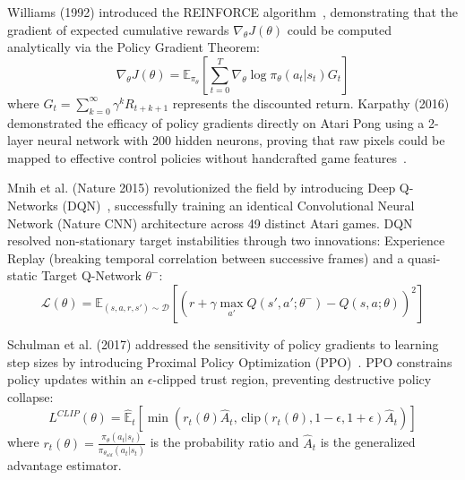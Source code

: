 \documentclass[12pt,a4paper]{report}
\begin{document}
Williams (1992) introduced the REINFORCE algorithm~\cite{williams1992simple}, demonstrating that the gradient of expected cumulative rewards $\nabla_\theta J(\theta)$ could be computed analytically via the Policy Gradient Theorem:
\begin{equation}
    \nabla_\theta J(\theta) = \mathbb{E}_{\pi_\theta} \left[ \sum_{t=0}^{T} \nabla_\theta \log \pi_\theta(a_t | s_t) G_t \right]
\end{equation}
where $G_t = \sum_{k=0}^{\infty} \gamma^k R_{t+k+1}$ represents the discounted return. Karpathy (2016) demonstrated the efficacy of policy gradients directly on Atari Pong using a 2-layer neural network with 200 hidden neurons, proving that raw pixels could be mapped to effective control policies without handcrafted game features~\cite{karpathy2016deeprl}.

Mnih et al. (Nature 2015) revolutionized the field by introducing Deep Q-Networks (DQN)~\cite{mnih2015human}, successfully training an identical Convolutional Neural Network (Nature CNN) architecture across 49 distinct Atari games. DQN resolved non-stationary target instabilities through two innovations: Experience Replay (breaking temporal correlation between successive frames) and a quasi-static Target Q-Network $\theta^-$:
\begin{equation}
    \mathcal{L}(\theta) = \mathbb{E}_{(s, a, r, s') \sim \mathcal{D}} \left[ \left( r + \gamma \max_{a'} Q(s', a'; \theta^-) - Q(s, a; \theta) \right)^2 \right]
\end{equation}

Schulman et al. (2017) addressed the sensitivity of policy gradients to learning step sizes by introducing Proximal Policy Optimization (PPO)~\cite{schulman2017proximal}. PPO constrains policy updates within an $\epsilon$-clipped trust region, preventing destructive policy collapse:
\begin{equation}
    L^{CLIP}(\theta) = \hat{\mathbb{E}}_t \left[ \min\left( r_t(\theta)\hat{A}_t, \, \text{clip}(r_t(\theta), 1-\epsilon, 1+\epsilon)\hat{A}_t \right) \right]
\end{equation}
where $r_t(\theta) = \frac{\pi_\theta(a_t|s_t)}{\pi_{\theta_{old}}(a_t|s_t)}$ is the probability ratio and $\hat{A}_t$ is the generalized advantage estimator.
\end{document}
